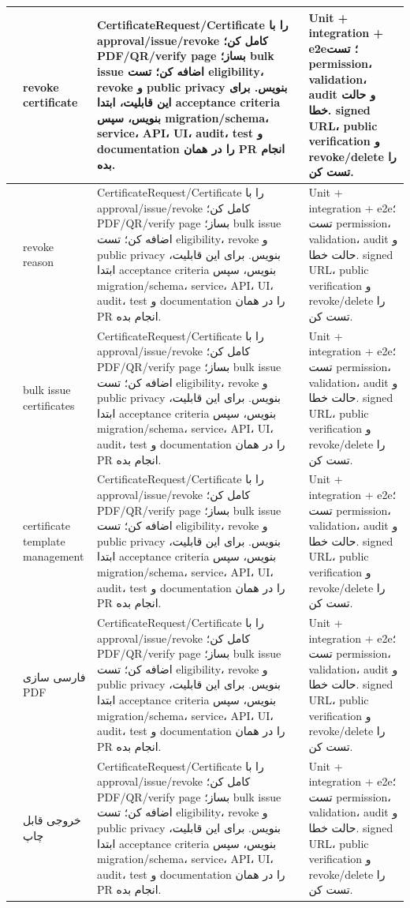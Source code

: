 \documentclass[11pt,a4paper]{article}
\begin{document}
\begin{longtable}{|>{\raggedleft\arraybackslash}p{}|>{\raggedleft\arraybackslash}p{}|>{\raggedleft\arraybackslash}p{}|>{\raggedleft\arraybackslash}p{}|}
211 & revoke certificate & CertificateRequest/Certificate را با approval/issue/revoke کامل کن؛ PDF/QR/verify page بساز؛ bulk issue اضافه کن؛ تست eligibility، revoke و public privacy بنویس. برای این قابلیت، ابتدا acceptance criteria بنویس، سپس migration/schema، service، API، UI، audit، test و documentation را در همان PR انجام بده. & Unit + integration + e2e؛ تست permission، validation، audit و حالت خطا. signed URL، public verification و revoke/delete را تست کن. \\ \hline
212 & revoke reason & CertificateRequest/Certificate را با approval/issue/revoke کامل کن؛ PDF/QR/verify page بساز؛ bulk issue اضافه کن؛ تست eligibility، revoke و public privacy بنویس. برای این قابلیت، ابتدا acceptance criteria بنویس، سپس migration/schema، service، API، UI، audit، test و documentation را در همان PR انجام بده. & Unit + integration + e2e؛ تست permission، validation، audit و حالت خطا. signed URL، public verification و revoke/delete را تست کن. \\ \hline
213 & bulk issue certificates & CertificateRequest/Certificate را با approval/issue/revoke کامل کن؛ PDF/QR/verify page بساز؛ bulk issue اضافه کن؛ تست eligibility، revoke و public privacy بنویس. برای این قابلیت، ابتدا acceptance criteria بنویس، سپس migration/schema، service، API، UI، audit، test و documentation را در همان PR انجام بده. & Unit + integration + e2e؛ تست permission، validation، audit و حالت خطا. signed URL، public verification و revoke/delete را تست کن. \\ \hline
214 & certificate template management & CertificateRequest/Certificate را با approval/issue/revoke کامل کن؛ PDF/QR/verify page بساز؛ bulk issue اضافه کن؛ تست eligibility، revoke و public privacy بنویس. برای این قابلیت، ابتدا acceptance criteria بنویس، سپس migration/schema، service، API، UI، audit، test و documentation را در همان PR انجام بده. & Unit + integration + e2e؛ تست permission، validation، audit و حالت خطا. signed URL، public verification و revoke/delete را تست کن. \\ \hline
215 & فارسی سازی PDF & CertificateRequest/Certificate را با approval/issue/revoke کامل کن؛ PDF/QR/verify page بساز؛ bulk issue اضافه کن؛ تست eligibility، revoke و public privacy بنویس. برای این قابلیت، ابتدا acceptance criteria بنویس، سپس migration/schema، service، API، UI، audit، test و documentation را در همان PR انجام بده. & Unit + integration + e2e؛ تست permission، validation، audit و حالت خطا. signed URL، public verification و revoke/delete را تست کن. \\ \hline
216 & خروجی قابل چاپ & CertificateRequest/Certificate را با approval/issue/revoke کامل کن؛ PDF/QR/verify page بساز؛ bulk issue اضافه کن؛ تست eligibility، revoke و public privacy بنویس. برای این قابلیت، ابتدا acceptance criteria بنویس، سپس migration/schema، service، API، UI، audit، test و documentation را در همان PR انجام بده. & Unit + integration + e2e؛ تست permission، validation، audit و حالت خطا. signed URL، public verification و revoke/delete را تست کن. \\ \hline

\end{longtable}
\end{document}
